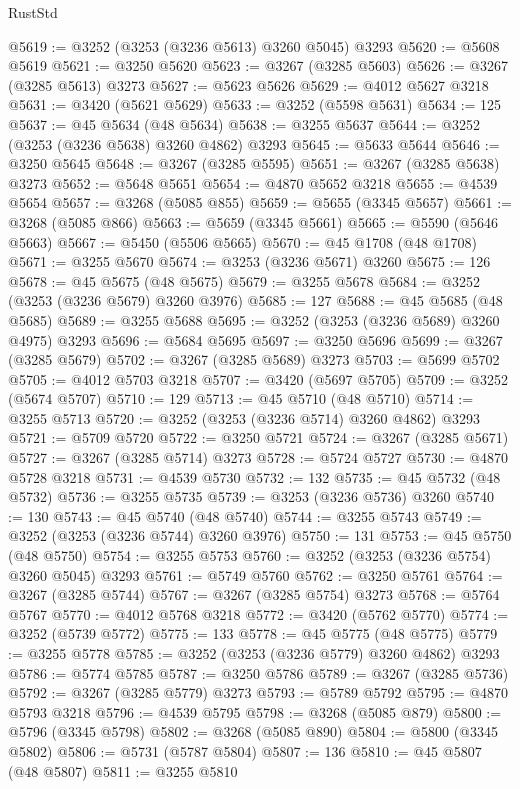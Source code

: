 \begin{lexlean}{RustStd}
\begin{coremodule}
@5619 := @3252 (@3253 (@3236 @5613) @3260 @5045) @3293
@5620 := @5608 @5619
@5621 := @3250 @5620
@5623 := @3267 (@3285 @5603)
@5626 := @3267 (@3285 @5613) @3273
@5627 := @5623 @5626
@5629 := @4012 @5627 @3218
@5631 := @3420 (@5621 @5629)
@5633 := @3252 (@5598 @5631)
@5634 := 125
@5637 := @45 @5634 (@48 @5634)
@5638 := @3255 @5637
@5644 := @3252 (@3253 (@3236 @5638) @3260 @4862) @3293
@5645 := @5633 @5644
@5646 := @3250 @5645
@5648 := @3267 (@3285 @5595)
@5651 := @3267 (@3285 @5638) @3273
@5652 := @5648 @5651
@5654 := @4870 @5652 @3218
@5655 := @4539 @5654
@5657 := @3268 (@5085 @855)
@5659 := @5655 (@3345 @5657)
@5661 := @3268 (@5085 @866)
@5663 := @5659 (@3345 @5661)
@5665 := @5590 (@5646 @5663)
@5667 := @5450 (@5506 @5665)
@5670 := @45 @1708 (@48 @1708)
@5671 := @3255 @5670
@5674 := @3253 (@3236 @5671) @3260
@5675 := 126
@5678 := @45 @5675 (@48 @5675)
@5679 := @3255 @5678
@5684 := @3252 (@3253 (@3236 @5679) @3260 @3976)
@5685 := 127
@5688 := @45 @5685 (@48 @5685)
@5689 := @3255 @5688
@5695 := @3252 (@3253 (@3236 @5689) @3260 @4975) @3293
@5696 := @5684 @5695
@5697 := @3250 @5696
@5699 := @3267 (@3285 @5679)
@5702 := @3267 (@3285 @5689) @3273
@5703 := @5699 @5702
@5705 := @4012 @5703 @3218
@5707 := @3420 (@5697 @5705)
@5709 := @3252 (@5674 @5707)
@5710 := 129
@5713 := @45 @5710 (@48 @5710)
@5714 := @3255 @5713
@5720 := @3252 (@3253 (@3236 @5714) @3260 @4862) @3293
@5721 := @5709 @5720
@5722 := @3250 @5721
@5724 := @3267 (@3285 @5671)
@5727 := @3267 (@3285 @5714) @3273
@5728 := @5724 @5727
@5730 := @4870 @5728 @3218
@5731 := @4539 @5730
@5732 := 132
@5735 := @45 @5732 (@48 @5732)
@5736 := @3255 @5735
@5739 := @3253 (@3236 @5736) @3260
@5740 := 130
@5743 := @45 @5740 (@48 @5740)
@5744 := @3255 @5743
@5749 := @3252 (@3253 (@3236 @5744) @3260 @3976)
@5750 := 131
@5753 := @45 @5750 (@48 @5750)
@5754 := @3255 @5753
@5760 := @3252 (@3253 (@3236 @5754) @3260 @5045) @3293
@5761 := @5749 @5760
@5762 := @3250 @5761
@5764 := @3267 (@3285 @5744)
@5767 := @3267 (@3285 @5754) @3273
@5768 := @5764 @5767
@5770 := @4012 @5768 @3218
@5772 := @3420 (@5762 @5770)
@5774 := @3252 (@5739 @5772)
@5775 := 133
@5778 := @45 @5775 (@48 @5775)
@5779 := @3255 @5778
@5785 := @3252 (@3253 (@3236 @5779) @3260 @4862) @3293
@5786 := @5774 @5785
@5787 := @3250 @5786
@5789 := @3267 (@3285 @5736)
@5792 := @3267 (@3285 @5779) @3273
@5793 := @5789 @5792
@5795 := @4870 @5793 @3218
@5796 := @4539 @5795
@5798 := @3268 (@5085 @879)
@5800 := @5796 (@3345 @5798)
@5802 := @3268 (@5085 @890)
@5804 := @5800 (@3345 @5802)
@5806 := @5731 (@5787 @5804)
@5807 := 136
@5810 := @45 @5807 (@48 @5807)
@5811 := @3255 @5810

\end{coremodule}
\end{lexlean}
